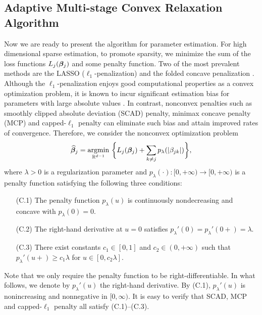 \documentclass[twoside,11pt]{article}
\newcommand*{\BR}{\mathbb{R}}
\newcommand*{\hbbeta}{\hat{\bbeta}}
\begin{document}


\subsection{Adaptive Multi-stage Convex Relaxation Algorithm} \label{subsec::estimation}
Now we are ready to present the algorithm for parameter estimation. For high dimensional sparse estimation,  to promote sparsity, we minimize the sum of the loss functions ${L_j}(\bm{\beta}_j)$ and some penalty function. Two of the most prevalent methods are the LASSO ($\ell_1$-penalization) \citep{tibshirani1996regression} and the folded concave  penalization \citep{fan2014strong}. Although the $\ell_1$-penalization enjoys good computational properties as a convex optimization problem, it is known to incur significant estimation bias for parameters with large absolute values \citep{zhang2008sparsity}. In contrast, nonconvex penalties such as smoothly clipped absolute deviation (SCAD) penalty, minimax concave penalty (MCP) and capped-$\ell_1$ penalty  can eliminate such bias and attain improved rates of convergence.  
Therefore, we consider the nonconvex optimization problem 
\begin{align}\label{equ::concave}
\hbbeta_j = \argmin\limits_{\BR^{d-1}}~  \biggl \{ L_j  (\bbeta_j) + \sum\limits_{k\neq j} p_{\lambda}(|\beta_{jk}|) \biggr \},
\end{align}
where $\lambda>0$ is  a  regularization parameter and  $p_{\lambda}(\cdot): [0,+\infty) \rightarrow  [0,+\infty) $ is a penalty function satisfying the following three conditions:
\begin{enumerate}
\item[(C.1)]\label{cond::penalty1} The penalty function $p_{\lambda}(u)$ is continuously nondecreasing and  concave with $p_{\lambda} (0) =0.$
\item[(C.2)]\label{cond::penalty2}  The right-hand derivative at $u=0$ satisfies $p_{\lambda}'(0) = p_{\lambda}'(0+) = \lambda.$
\item[(C.3)]\label{cond::penalty3} There exist constants $c_1\in [0,1]$ and $c_2\in (0,+\infty)$ such that $p_{\lambda}'(u+) \geq c_1 \lambda$ for $u\in [0,c_2 \lambda].$
\end{enumerate}
Note that we only require the penalty function to be right-differentiable. In what follows, we   denote by $p_{\lambda}'(u)$  the right-hand derivative. By   (C.1),  $p_{\lambda}'(u)$ is nonincreasing and nonnegative in $[0,\infty).$ It is easy to verify that SCAD, MCP and capped-$\ell_1$ penalty all  satisfy    (C.1)--(C.3).
\end{document}
